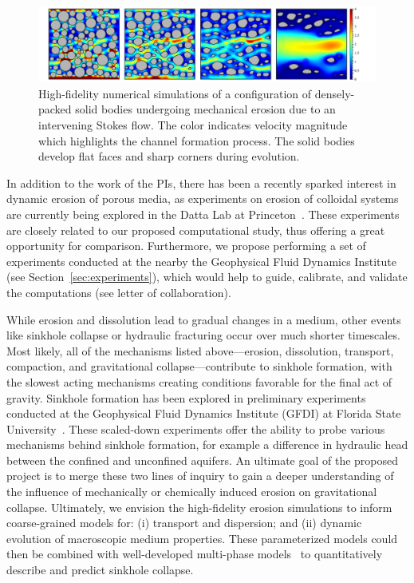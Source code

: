 \documentclass[11pt]{article}
\begin{document}
\begin{figure}%
\begin{center}
\includegraphics[width = 0.99 \textwidth]{./figs/80circ8vel.pdf}
\caption{\label{80circ8vel} High-fidelity numerical simulations of a configuration of densely-packed solid bodies undergoing mechanical erosion due to an intervening Stokes flow. The color indicates velocity magnitude which highlights the channel formation process. The solid bodies develop flat faces and sharp corners during evolution. }
\end{center}
\end{figure}
 
In addition to the work of the PIs, there has been a recently sparked interest in dynamic erosion of porous media, as experiments on erosion of colloidal systems are currently being explored in the Datta Lab at Princeton~\cite{bizmark2019multiscale}. These experiments are closely related to our proposed computational study, thus offering a great opportunity for comparison. Furthermore, we propose performing a set of experiments conducted at the nearby the Geophysical Fluid Dynamics Institute (see Section~\ref{sec:experiments}), which would help to guide, calibrate, and validate the computations (see letter of collaboration).  

While erosion and dissolution lead to gradual changes in a medium, other events like sinkhole collapse or hydraulic fracturing occur over much shorter timescales.  Most likely, all of the mechanisms listed above---erosion, dissolution, transport, compaction, and gravitational collapse---contribute to sinkhole formation, with the slowest acting mechanisms creating conditions favorable for the final act of gravity.  Sinkhole formation has been explored in preliminary experiments conducted at the Geophysical Fluid Dynamics Institute (GFDI) at Florida State University~\cite{tao2014experimental}. These scaled-down experiments offer the ability to probe various mechanisms behind sinkhole formation, for example a difference in hydraulic head between the confined and unconfined aquifers. An ultimate goal of the proposed project is to merge these two lines of inquiry to gain a deeper understanding of the influence of mechanically or chemically induced erosion on gravitational collapse.  Ultimately, we envision the high-fidelity erosion simulations to inform coarse-grained models for: (i) transport and dispersion; and (ii) dynamic evolution of macroscopic medium properties. These parameterized models could then be combined with well-developed multi-phase models~\cite{Imma2019, eastham2019multiphase} to quantitatively describe and predict sinkhole collapse.
\end{document}
